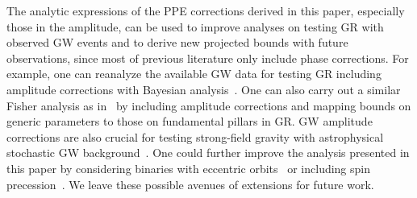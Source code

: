 \documentclass[prd,twocolumn,nofootinbib]{revtex4-1}
\newcommand{\st}[1]{\textcolor{cyan}{\it{\textbf{st: #1}}} }
\begin{document}
The analytic expressions of the PPE corrections derived in this paper, especially those in the amplitude, can be used to improve analyses on testing GR with observed GW events and to derive new projected bounds with future observations, since most of previous literature only include phase corrections. For example, one can reanalyze the available GW data for testing GR including amplitude corrections with Bayesian analysis~\cite{TheLIGOScientific:2016src}. One can also carry out a similar Fisher analysis as in~\cite{Yunes:2016jcc} by including amplitude corrections and mapping bounds on generic parameters to those on fundamental pillars in GR. GW amplitude corrections are also crucial for testing strong-field gravity with astrophysical stochastic GW background~\cite{Maselli:2016ekw,Yagi:2017zhb}. One could further improve the analysis presented in this paper by considering binaries with eccentric orbits~\cite{Loutrel:2014vja} or including spin precession~\cite{Huwyler:2014gaa,Loutrel:2018ydv}.
We leave these possible avenues of extensions for future work. 

\end{document}
